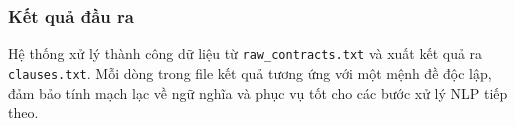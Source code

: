\subsubsection{Kết quả đầu ra}
Hệ thống xử lý thành công dữ liệu từ \texttt{raw\_contracts.txt} và xuất kết quả ra \texttt{clauses.txt}. Mỗi dòng trong file kết quả tương ứng với một mệnh đề độc lập, đảm bảo tính mạch lạc về ngữ nghĩa và phục vụ tốt cho các bước xử lý NLP tiếp theo.